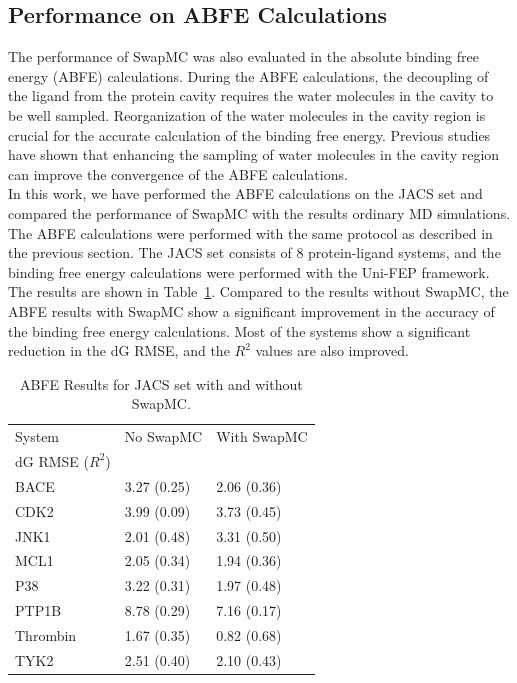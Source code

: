 \documentclass[journal=jacsat,manuscript=article]{achemso}
\begin{document}
\subsection{Performance on ABFE Calculations}
The performance of SwapMC was also evaluated in the absolute binding free energy (ABFE) calculations.
During the ABFE calculations, the decoupling of the ligand from the protein cavity requires the water molecules in the cavity to be well sampled.
Reorganization of the water molecules in the cavity region is crucial for the accurate calculation of the binding free energy.
Previous studies~\cite{Liu2025} have shown that enhancing the sampling of water molecules in the cavity region can improve the convergence of the ABFE calculations. \\
\newline
In this work, we have performed the ABFE calculations on the JACS set and compared the performance of SwapMC with the results ordinary MD simulations.
The ABFE calculations were performed with the same protocol as described in the previous section.
The JACS set consists of 8 protein-ligand systems, and the binding free energy calculations were performed with the Uni-FEP framework.
The results are shown in Table~\ref{tbl:abfe_jacs}.
Compared to the results without SwapMC, the ABFE results with SwapMC show a significant improvement in the accuracy of the binding free energy calculations.
Most of the systems show a significant reduction in the dG RMSE, and the $R^2$ values are also improved.

\begin{table}
  \caption{ABFE Results for JACS set with and without SwapMC.}
  \label{tbl:abfe_jacs}
  \begin{tabular}{l|ll}
    \hline
    System                    & No SwapMC     & With SwapMC    \\
    dG RMSE ($R^2$)           &               &    \\
    \hline
    BACE                      & 3.27 (0.25) & 2.06 (0.36)  \\
    CDK2                      & 3.99 (0.09) & 3.73 (0.45)  \\
    JNK1                      & 2.01 (0.48) & 3.31 (0.50)  \\
    MCL1                      & 2.05 (0.34) & 1.94 (0.36)  \\
    P38                       & 3.22 (0.31) & 1.97 (0.48) \\
    PTP1B                     & 8.78 (0.29) & 7.16 (0.17) \\
    Thrombin                  & 1.67 (0.35) & 0.82 (0.68) \\
    TYK2                      & 2.51 (0.40) & 2.10 (0.43) \\
    \hline
  \end{tabular}
\end{table}
\end{document}
